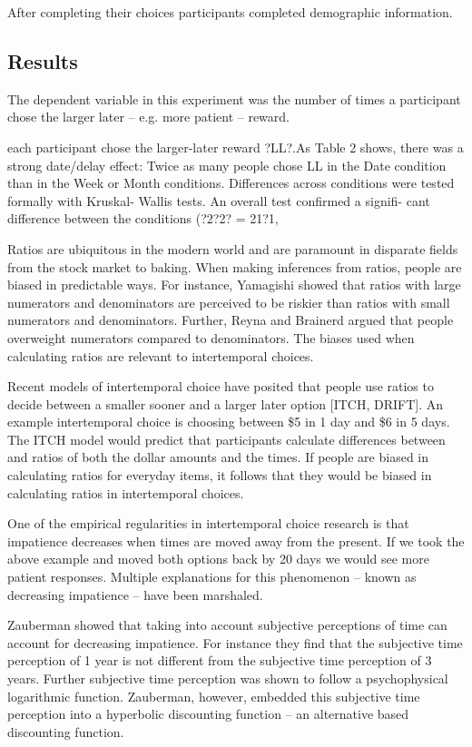 \documentclass[]{article}
\begin{document}
After completing their choices participants completed demographic information.

\subsection{Results}

The dependent variable in this experiment was the number of times a participant chose the larger later -- e.g. more patient -- reward. 

each participant chose the larger-later reward ?LL?.As Table 2 shows, there was a strong date/delay effect: Twice as many people chose LL in the Date condition than in the Week or Month conditions. Differences across conditions were tested formally with Kruskal- Wallis tests. An overall test confirmed a signifi- cant difference between the conditions (?2?2? = 21?1,






Ratios are ubiquitous in the modern world and are paramount in disparate fields from the stock market to baking. 
When making inferences from ratios, people are biased in predictable ways.
For instance, Yamagishi showed that ratios with large numerators and denominators are perceived to be riskier than ratios with small numerators and denominators. Further, Reyna and Brainerd argued that people overweight numerators compared to denominators.
The biases used when calculating ratios are relevant to intertemporal choices. 

Recent models of intertemporal choice have posited that people use ratios to decide between a smaller sooner and a larger later option [ITCH, DRIFT]. 
An example intertemporal choice is choosing between \$5 in 1 day and \$6 in 5 days. 
The ITCH model would predict that participants calculate differences between and ratios of both the dollar amounts and the times. 
If people are biased in calculating ratios for everyday items, it follows that they would be biased in calculating ratios in intertemporal choices. 

One of the empirical regularities in intertemporal choice research is that impatience decreases when times are moved away from the present.
If we took the above example and moved both options back by 20 days we would see more patient responses. 
Multiple explanations for this phenomenon -- known as decreasing impatience -- have been marshaled. 

Zauberman showed that taking into account subjective perceptions of time can account for decreasing impatience. 
For instance they find that the subjective time perception of 1 year is not different from the subjective time perception of 3 years. 
Further subjective time perception was shown to follow a psychophysical logarithmic function. Zauberman, however, embedded this subjective time perception into a hyperbolic discounting function – an alternative based discounting function.  
\end{document}
